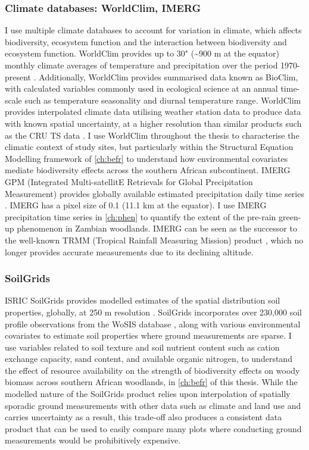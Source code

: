 \begin{refsection}
\subsubsection{Climate databases: WorldClim, IMERG}
\label{intro:sssec:clim}

I use multiple climate databases to account for variation in climate, which affects biodiversity, ecosystem function and the interaction between biodiversity and ecosystem function. WorldClim provides up to 30" (\textasciitilde{}900 m at the equator) monthly climate averages of temperature and precipitation over the period 1970-present \citep{Fick2017}. Additionally, WorldClim provides summarised data known as BioClim, with calculated variables commonly used in ecological science at an annual time-scale such as temperature seasonality and diurnal temperature range. WorldClim provides interpolated climate data utilising weather station data to produce data with known spatial uncertainty, at a higher resolution than similar products such as the CRU TS data \citep{Harris2013}. I use WorldClim throughout the thesis to characterise the climatic context of study sites, but particularly within the Structural Equation Modelling framework of \autoref{ch:befr} to understand how environmental covariates mediate biodiversity effects across the southern African subcontinent. IMERG GPM (Integrated Multi-satellitE Retrievals for Global Precipitation Measurement) provides globally available estimated precipitation daily time series \citep{IMERG}. IMERG has a pixel size of 0.1\textdegree{} (11.1 km at the equator). I use IMERG precipitation time series in \autoref{ch:phen} to quantify the extent of the pre-rain green-up phenomenon in Zambian woodlands. IMERG can be seen as the successor to the well-known TRMM (Tropical Rainfall Measuring Mission) product \citep{Bowman2007}, which no longer provides accurate measurements due to its declining altitude.

\subsubsection{SoilGrids}
\label{intro:sssec:soil}

ISRIC SoilGrids provides modelled estimates of the spatial distribution soil properties, globally, at 250 m resolution \citep{Hengl2017}. SoilGrids incorporates over 230,000 soil profile observations from the WoSIS database \citep{Batjes2017}, along with various environmental covariates to estimate soil properties where ground measurements are sparse. I use variables related to soil texture and soil nutrient content such as cation exchange capacity, sand content, and available organic nitrogen, to understand the effect of resource availability on the strength of biodiversity effects on woody biomass across southern African woodlands, in \autoref{ch:befr} of this thesis. While the modelled nature of the SoilGrids product relies upon interpolation of spatially sporadic ground measurements with other data such as climate and land use and carries uncertainty as a result, this trade-off also produces a consistent data product that can be used to easily compare many plots where conducting ground measurements would be prohibitively expensive.


\end{refsection}
